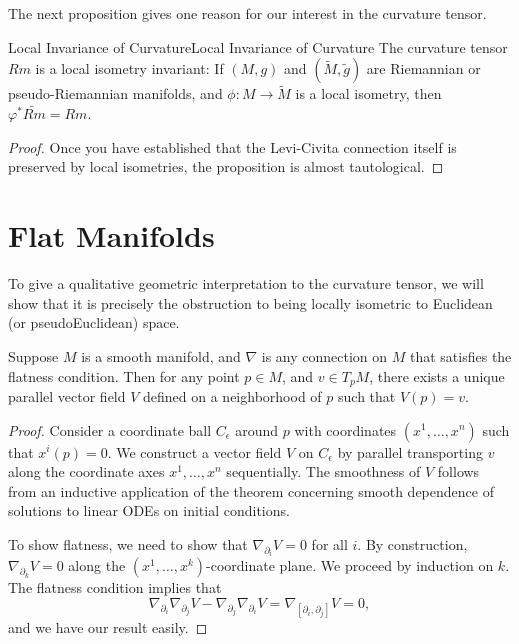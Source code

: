 \documentclass[../main.tex]{subfiles}
\begin{document}
The next proposition gives one reason for our interest in the curvature tensor.

\begin{proposition}{Local Invariance of Curvature}{Local Invariance of Curvature}
	The curvature tensor $Rm$ is a local isometry invariant: If $(M, g)$ and $(\tilde{M}, \tilde{g})$ are Riemannian or pseudo-Riemannian manifolds, and $\phi: M \to \tilde{M}$ is a local isometry, then $\varphi^* \tilde{Rm} = Rm$.
\end{proposition}
\begin{proof}
	Once you have established that the Levi-Civita connection itself is preserved by local isometries, the proposition is almost tautological.
\end{proof}

\section{Flat Manifolds}
To give a qualitative geometric interpretation to the curvature tensor, we will show that it is precisely the obstruction to being locally isometric to Euclidean (or pseudoEuclidean) space.

\begin{lemma}{}{}
	Suppose $M$ is a smooth manifold, and $\nabla$ is any connection on $M$ that satisfies the flatness condition. Then for any point $p \in M$, and $v \in T_p M$, there exists a unique parallel vector field $V$ defined on a neighborhood of $p$ such that $V(p) = v$.
\end{lemma}
\begin{proof}
	Consider a coordinate ball $C_\epsilon$ around $p$ with coordinates $(x^1, \ldots, x^n)$ such that $x^i(p) = 0$. We construct a vector field $V$ on $C_\epsilon$ by parallel transporting $v$ along the coordinate axes $x^1, \ldots, x^n$ sequentially. The smoothness of $V$ follows from an inductive application of the theorem concerning smooth dependence of solutions to linear ODEs on initial conditions.

	To show flatness, we need to show that $\nabla_{\partial_i} V = 0$ for all $i$. By construction, $\nabla_{\partial_k} V = 0$ along the $(x^1, \ldots , x^k)$-coordinate plane. We proceed by induction on $k$. The flatness condition implies that
	\begin{equation*}
		\nabla_{\partial_i} \nabla_{\partial_j} V - \nabla_{\partial_j} \nabla_{\partial_i} V = \nabla_{[\partial_i, \partial_j]} V = 0,
	\end{equation*}
	and we have our result easily.
\end{proof}
\end{document}
